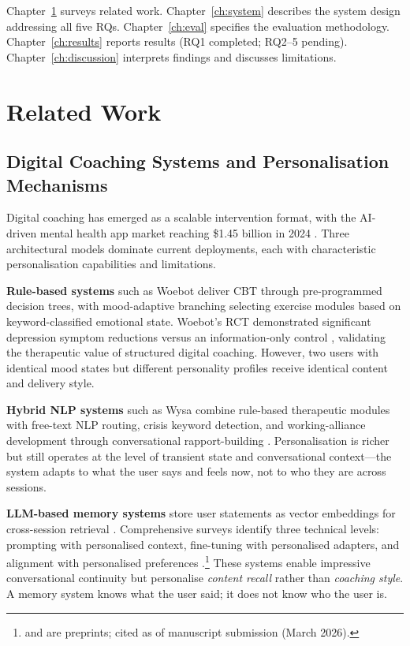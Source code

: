 \documentclass[10pt,a4paper]{report}
\begin{document}
Chapter~\ref{ch:related} surveys related work. Chapter~\ref{ch:system} describes the system design addressing all five RQs. Chapter~\ref{ch:eval} specifies the evaluation methodology. Chapter~\ref{ch:results} reports results (RQ1 completed; RQ2--5 pending). Chapter~\ref{ch:discussion} interprets findings and discusses limitations.

\chapter{Related Work}
\label{ch:related}

\section{Digital Coaching Systems and Personalisation Mechanisms}

Digital coaching has emerged as a scalable intervention format, with the AI-driven mental health app market reaching \$1.45 billion in 2024 \citep{GrandView2024}. Three architectural models dominate current deployments, each with characteristic personalisation capabilities and limitations.

\textbf{Rule-based systems} such as Woebot \citep{Fitzpatrick2017} deliver CBT through pre-programmed decision trees, with mood-adaptive branching selecting exercise modules based on keyword-classified emotional state. Woebot's RCT demonstrated significant depression symptom reductions versus an information-only control \citep{Fitzpatrick2017}, validating the therapeutic value of structured digital coaching. However, two users with identical mood states but different personality profiles receive identical content and delivery style.

\textbf{Hybrid NLP systems} such as Wysa \citep{Inkster2018} combine rule-based therapeutic modules with free-text NLP routing, crisis keyword detection, and working-alliance development through conversational rapport-building \citep{Beatty2022}. Personalisation is richer but still operates at the level of transient state and conversational context---the system adapts to what the user says and feels now, not to who they are across sessions.

\textbf{LLM-based memory systems} store user statements as vector embeddings for cross-session retrieval \citep{Li2024}. Comprehensive surveys identify three technical levels: prompting with personalised context, fine-tuning with personalised adapters, and alignment with personalised preferences \citep{Liu2025, Wang2026}.\footnote{\citet{Liu2025} and \citet{Wang2026} are preprints; cited as of manuscript submission (March 2026).} These systems enable impressive conversational continuity but personalise \emph{content recall} rather than \emph{coaching style}. A memory system knows what the user said; it does not know who the user is.
\end{document}
